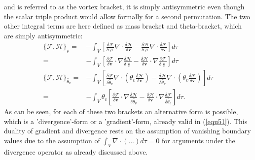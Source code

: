 and is referred to as the vortex bracket, it is simply antisymmetric even though the scalar triple product would allow formally for a second permutation.
The two other integral terms are here defined as mass bracket and theta-bracket, which are simply antisymmetric:
\begin{align}
\lbrace \mathcal{F}, \mathcal{H}\rbrace_{\varrho}
=&
-\!\!\int_V \left[ \frac{\delta \mathcal{F}}{\delta \varrho} \nabla \cdot \frac{\delta \mathcal{H}}{\delta \mathbf{v}} - \frac{\delta \mathcal{H}}{\delta \varrho} \nabla \cdot \frac{\delta \mathcal{F}}{\delta \mathbf{v}} \right] d \tau \nonumber \\
=& -\!\!\int_V \left[ \frac{\delta \mathcal{F}}{\delta \mathbf{v}}\cdot \nabla \frac{\delta \mathcal{H}}{\delta \varrho}- \frac{\delta \mathcal{H}}{\delta \mathbf{v}}\cdot \nabla
\frac{\delta \mathcal{F}}{\delta \varrho} \right] d \tau \label{equ64}\\
\lbrace\mathcal{F}, \mathcal{H}\rbrace_{\tilde{\theta_v}}=&
-\!\!\int_V \!\!\left[\frac{\delta \mathcal{F}}{\delta \tilde{\theta_v}}\nabla \!\cdot\! ( \theta_v\frac{\delta \mathcal{H}}{\delta \mathbf{v}})\!-\! \frac{\delta \mathcal{H}}{\delta \tilde{\theta_v}}\nabla \!\cdot\! ( \theta_v\frac{\delta \mathcal{F}}{\delta \mathbf{v}})\right] d\tau \nonumber \\
=&-\!\!\int_V \!\theta_v\! \left[ \frac{\delta \mathcal{F}}{\delta \mathbf{v}}\!\cdot\! \nabla
\frac{\delta \mathcal{H}}{\delta \tilde{\theta_v}}\! - \! \frac{\delta \mathcal{H}}{\delta \mathbf{v}} \!\cdot\! \nabla \frac{\delta \mathcal{F}}{\delta \tilde{\theta_v}}        \right] d\tau.\label{equ65}
\end{align} 
As can be seen, for each of these two brackets an alternative form is possible, which is a 'divergence'-form or a 'gradient'-form, already valid in (\ref{equ51}). This duality of gradient and divergence rests on the assumption of vanishing boundary values due to the assumption of $\int_V \nabla \cdot ( ... ) d\tau =0$ for arguments under the divergence operator as already discussed above.


